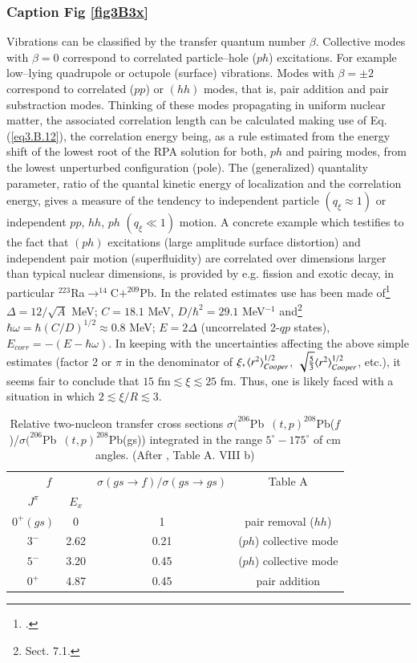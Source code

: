          \subsubsection{Caption Fig \ref{fig3B3x}}
         Vibrations can be classified by the transfer quantum number $\beta$. Collective modes with $\beta=0$ correspond to correlated particle--hole ($ph$) excitations. For example low--lying quadrupole or octupole (surface)  vibrations. Modes with  $\beta=\pm2$  correspond to correlated ($pp$) or $(hh)$ modes, that is, pair addition and pair substraction modes.
         Thinking of these modes propagating in uniform nuclear matter, the associated correlation length can be calculated making use of Eq. (\ref{eq3.B.12}), the correlation energy being, as a rule estimated from the energy shift of the lowest root of the RPA solution for both, $ph$ and pairing modes, from the lowest unperturbed configuration (pole). The (generalized) quantality parameter, ratio of the quantal kinetic energy of localization and the correlation energy,  gives a measure of the tendency to independent particle $(q_\xi\approx1)$ or independent $pp$, $hh$, $ph$ $(q_\xi\ll1)$ motion. A concrete example which testifies to the fact that $(ph)$ excitations (large amplitude surface distortion) and independent pair motion (superfluidity) are correlated over dimensions larger than typical nuclear dimensions, is provided by e.g. fission and exotic decay, in particular $^{223}$Ra$\rightarrow^{14}$C$+^{209}$Pb. In the related estimates use has been made of\footnote{\cite{Bohr:69}.} $\Delta=12/\sqrt{A}$ MeV; $C=18.1$ MeV, $D/\hbar^2=29.1$ MeV$^{-1}$ and\footnote{\cite{Brink:05} Sect. 7.1.} $\hbar\omega=\hbar(C/D)^{1/2}\approx0.8$ MeV; $E=2\Delta$ (uncorrelated 2-$qp$ states), $E_{corr}=-(E-\hbar\omega)$. In keeping with the uncertainties affecting the above simple estimates (factor 2 or $\pi$ in the denominator of $\xi,\langle {r^2} \rangle^{1/2}_{Cooper}$,  $\sqrt{\frac{5}{3}}\langle {r^2} \rangle^{1/2}_{Cooper}$, etc.), it seems fair to conclude that $15\text{ fm}\lesssim\xi\lesssim25\text{ fm}$. Thus, one is likely faced with a  situation in which $2\lesssim\xi/R\lesssim3.$
    \begin{table}
    	\begin{tabular}{|c|c|c|c|}
    		\hline
    		\multicolumn{2}{|c|}{$f$} & $\sigma(gs\rightarrow f)/\sigma(gs\rightarrow gs)$ & Table A   \\
    		\cline{1-2}
    		$J^{\pi}$& $E_x$ & & \\
    		\hline
    		$0^+(gs)$ & 0& 1& pair removal ($hh$)\\
    		\hline
    		$3^-$ & 2.62& 0.21& ($ph$) collective mode\\
    		\hline
    		$5^-$ & 3.20& 0.45& ($ph$) collective mode\\
    		\hline
    		$0^+$ & 4.87& 0.45& pair addition\\
    		\hline
    	\end{tabular}\caption{Relative two-nucleon transfer cross sections \mbox{$\sigma (^{206}$Pb $(t,p)^{208}$Pb($f$)/$\sigma (^{206}$Pb $(t,p)^{208}$Pb(gs))} integrated in the range $5^\circ-175^\circ$ of cm angles. (After \cite{Broglia:73}, Table A. VIII b)}\label{Tab3.B.1}
    \end{table}
